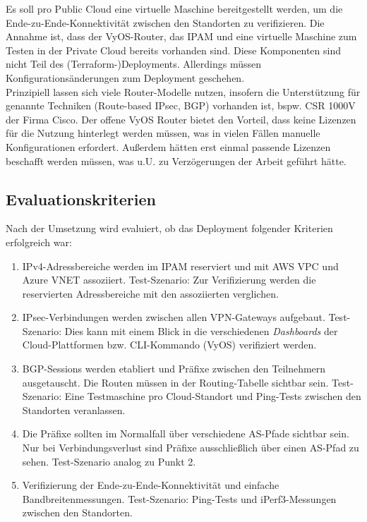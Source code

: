 Es soll pro Public Cloud eine virtuelle Maschine bereitgestellt werden, um die Ende-zu-Ende-Konnektivität zwischen den Standorten zu verifizieren.
Die Annahme ist, dass der VyOS-Router, das \gls{IPAM} und eine virtuelle Maschine zum Testen in der Private Cloud bereits vorhanden sind. Diese Komponenten sind nicht Teil des (Terraform-)Deployments. Allerdings müssen Konfigurationsänderungen zum \gls{Deployment} geschehen.\\
Prinzipiell lassen sich viele Router-Modelle nutzen, insofern die Unterstützung für genannte Techniken (Route-based \gls{IPsec}, \gls{BGP}) vorhanden ist, bspw. CSR 1000V der Firma Cisco\cite{Durai2016}. Der offene VyOS Router bietet den Vorteil, dass keine Lizenzen für die Nutzung hinterlegt werden müssen, was in vielen Fällen manuelle Konfigurationen erfordert. Außerdem hätten erst einmal passende Lizenzen beschafft werden müssen, was u.U. zu Verzögerungen der Arbeit geführt hätte.
\subsection{Evaluationskriterien}\label{eval-kriterien-uc1}
Nach der Umsetzung wird evaluiert, ob das \gls{Deployment} folgender Kriterien erfolgreich war:
\begin{enumerate}
    \item IPv4-Adressbereiche werden im \gls{IPAM} reserviert und mit AWS \gls{VPC} und Azure \gls{VNET} assoziiert. Test-Szenario: Zur Verifizierung werden die reservierten Adressbereiche mit den assoziierten verglichen.
    \item \gls{IPsec}-Verbindungen werden zwischen allen \gls{VPN-Gateway}s aufgebaut. Test-Szenario: Dies kann mit einem Blick in die verschiedenen \textit{Dashboards} der Cloud-Plattformen bzw. \gls{CLI}-Kommando (VyOS) verifiziert werden.
    \item \gls{BGP}-Sessions werden etabliert und Präfixe zwischen den Teilnehmern ausgetauscht. Die Routen müssen in der Routing-Tabelle sichtbar sein. Test-Szenario: Eine Testmaschine pro Cloud-Standort und Ping-Tests zwischen den Standorten veranlassen.
    \item Die Präfixe sollten im Normalfall über verschiedene \gls{AS}-Pfade sichtbar sein. Nur bei Verbindungsverlust sind Präfixe ausschließlich über einen \gls{AS}-Pfad zu sehen. Test-Szenario analog zu Punkt 2.
    \item Verifizierung der Ende-zu-Ende-Konnektivität und einfache Bandbreitenmessungen. Test-Szenario: Ping-Tests und iPerf3-Messungen zwischen den Standorten.
\end{enumerate}
